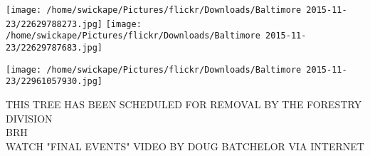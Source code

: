 \documentclass[10pt,letterpaper]{article}
\begin{document}
\texttt{[image: /home/swickape/Pictures/flickr/Downloads/Baltimore 2015-11-23/22629788273.jpg]}
\texttt{[image: /home/swickape/Pictures/flickr/Downloads/Baltimore 2015-11-23/22629787683.jpg]}

\texttt{[image: /home/swickape/Pictures/flickr/Downloads/Baltimore 2015-11-23/22961057930.jpg]}

THIS TREE HAS BEEN SCHEDULED FOR REMOVAL BY THE FORESTRY DIVISION\\
BRH\\
WATCH "FINAL EVENTS" VIDEO BY DOUG BATCHELOR VIA INTERNET
\pagebreak
\end{document}
